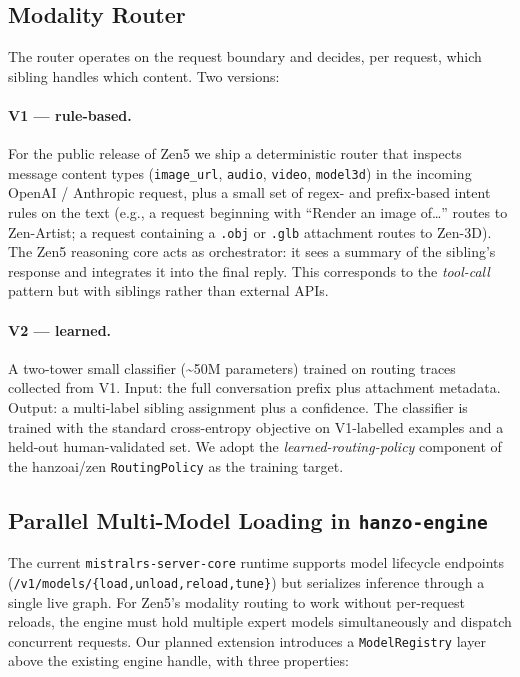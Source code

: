 \documentclass[11pt,a4paper]{article}
\begin{document}
\subsection{Modality Router}

The router operates on the request boundary and decides, per request, which sibling handles which
content. Two versions:

\paragraph{V1 --- rule-based.} For the public release of Zen5 we ship a deterministic router that
inspects message content types (\texttt{image\_url}, \texttt{audio}, \texttt{video}, \texttt{model3d})
in the incoming OpenAI / Anthropic request, plus a small set of regex- and prefix-based intent rules
on the text (e.g., a request beginning with ``Render an image of\ldots'' routes to Zen-Artist; a
request containing a \texttt{.obj} or \texttt{.glb} attachment routes to Zen-3D). The Zen5 reasoning
core acts as orchestrator: it sees a summary of the sibling's response and integrates it into the
final reply. This corresponds to the \emph{tool-call} pattern but with siblings rather than external
APIs.

\paragraph{V2 --- learned.} A two-tower small classifier (\textasciitilde 50M parameters) trained on
routing traces collected from V1. Input: the full conversation prefix plus attachment metadata.
Output: a multi-label sibling assignment plus a confidence. The classifier is trained with the
standard cross-entropy objective on V1-labelled examples and a held-out human-validated set. We
adopt the \emph{learned-routing-policy} component of the hanzoai/zen \texttt{RoutingPolicy}
\cite{hanzoai-zen} as the training target.

\subsection{Parallel Multi-Model Loading in \texttt{hanzo-engine}}

The current \texttt{mistralrs-server-core} runtime supports model lifecycle endpoints
(\texttt{/v1/models/\{load,unload,reload,tune\}}) but serializes inference through a single live
graph. For Zen5's modality routing to work without per-request reloads, the engine must hold multiple
expert models simultaneously and dispatch concurrent requests. Our planned extension introduces a
\texttt{ModelRegistry} layer above the existing engine handle, with three properties:
\end{document}
